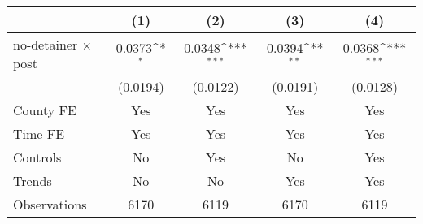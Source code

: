 {
\def\sym#1{\ifmmode^{#1}\else\(^{#1}\)\fi}
\begin{tabular}{l*{4}{c}}
\hline\hline
                    &\multicolumn{1}{c}{(1)}         &\multicolumn{1}{c}{(2)}         &\multicolumn{1}{c}{(3)}         &\multicolumn{1}{c}{(4)}         \\
\hline
no-detainer $\times$ post&      0.0373\sym{*}  &      0.0348\sym{***}&      0.0394\sym{**} &      0.0368\sym{***}\\
                    &    (0.0194)         &    (0.0122)         &    (0.0191)         &    (0.0128)         \\
[1em]
County FE           &         Yes         &         Yes         &         Yes         &         Yes         \\
[1em]
Time FE             &         Yes         &         Yes         &         Yes         &         Yes         \\
[1em]
Controls            &          No         &         Yes         &          No         &         Yes         \\
[1em]
Trends              &          No         &          No         &         Yes         &         Yes         \\
\hline
Observations        &        6170         &        6119         &        6170         &        6119         \\
\hline\hline
\end{tabular}
}

